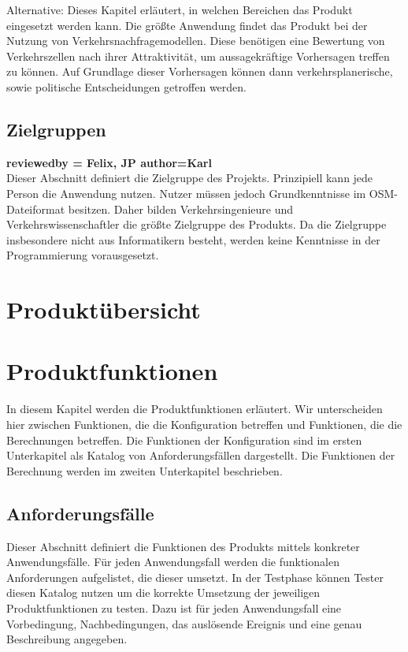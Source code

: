 \documentclass[parskip=full]{scrartcl} %
\begin{document}
Alternative:
Dieses Kapitel erläutert, in welchen Bereichen das Produkt eingesetzt werden kann. Die größte Anwendung findet das Produkt bei der Nutzung von Verkehrsnachfragemodellen. Diese benötigen eine Bewertung von Verkehrszellen nach ihrer Attraktivität, um aussagekräftige Vorhersagen treffen zu können. Auf Grundlage dieser Vorhersagen können dann verkehrsplanerische, sowie politische Entscheidungen getroffen werden.


\subsection{Zielgruppen}
\textbf{reviewedby = Felix, JP author=Karl\\}
Dieser Abschnitt definiert die Zielgruppe des Projekts. Prinzipiell kann jede Person die Anwendung nutzen. Nutzer müssen jedoch Grundkenntnisse im OSM-Dateiformat besitzen. Daher bilden Verkehrsingenieure und Verkehrswissenschaftler die größte Zielgruppe des Produkts. Da die Zielgruppe insbesondere nicht aus Informatikern besteht, werden keine Kenntnisse in der Programmierung vorausgesetzt.
\newpage







\section{Produktübersicht}
\newpage










\section{Produktfunktionen}
In diesem Kapitel werden die Produktfunktionen erläutert. Wir unterscheiden hier zwischen Funktionen, die die Konfiguration betreffen und Funktionen, die die Berechnungen betreffen. Die Funktionen der Konfiguration sind im ersten Unterkapitel als Katalog von Anforderungsfällen dargestellt. Die Funktionen der Berechnung werden im zweiten Unterkapitel beschrieben.

\subsection{Anforderungsfälle}
Dieser Abschnitt definiert die Funktionen des Produkts mittels konkreter Anwendungsfälle. Für jeden Anwendungsfall werden die funktionalen Anforderungen aufgelistet, die dieser umsetzt. In der Testphase können Tester diesen Katalog nutzen um die korrekte Umsetzung der jeweiligen Produktfunktionen zu testen. Dazu ist für jeden Anwendungsfall eine Vorbedingung, Nachbedingungen, das auslösende Ereignis und eine genau Beschreibung angegeben.
\newpage
\end{document}
